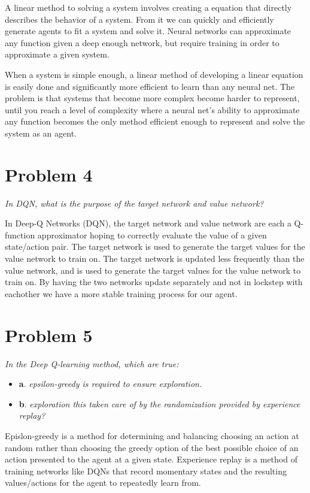 \documentclass{article}
\begin{document}
A linear method to solving a system involves creating a equation that directly describes the behavior of a system. From it we can quickly and efficiently generate agents to fit a system and solve it. Neural networks can approximate any function given a deep enough network, but require training in order to approximate a given system.

When a system is simple enough, a linear method of developing a linear equation is easily done and significantly more efficient to learn than any neural net. The problem is that systems that become more complex become harder to represent, until you reach a level of complexity where a neural net's ability to approximate any function becomes the only method efficient enough to represent and solve the system as an agent.

\section*{Problem 4}
\textit{In DQN, what is the purpose of the target network and value network?}

In Deep-Q Networks (DQN), the target network and value network are each a Q-function approximator hoping to correctly evaluate the value of a given state/action pair. The target network is used to generate the target values for the value network to train on. The target network is updated less frequently than the value network, and is used to generate the target values for the value network to train on. By having the two networks update separately and not in lockstep with eachother we have a more stable training process for our agent.

\section*{Problem 5}
\textit{In the Deep Q-learning method, which are true:}
\begin{itemize}
    \item \textbf{a}. \textit{epsilon-greedy is required to ensure exploration.}
    \item \textbf{b}. \textit{exploration this taken care of by the randomization provided by experience replay?}
\end{itemize}

Epislon-greedy is a method for determining and balancing choosing an action at random rather than choosing the greedy option of the best possible choice of an action presented to the agent at a given state. Experience replay is a method of training networks like DQNs that record momentary states and the resulting values/actions for the agent to repeatedly learn from.
\end{document}
